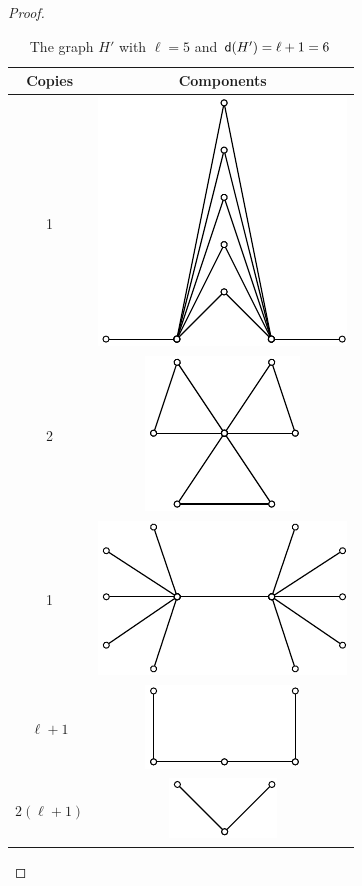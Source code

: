 \begin{proof}
\begin{table} [ht]
\begin{minipage}{.4\linewidth}
\begin{tabular}
\hline
\end{tabular}
\end{minipage} %
\qquad
\begin{minipage}{.4\linewidth}
\centering
\caption{The graph $ H' $ with $ \ell = 5 $ and $ {\mathsf{d}}(H') = \ell + 1 = 6 $}
\begin{tabular}
{c|c} \hline Copies & Components \\
\hline 1 & \includegraphics[width=0.40\columnwidth]{graphs/Hpplanartriangle1.pdf} \\
\hline 2 & \includegraphics[width=0.25\columnwidth]{graphs/Hpplanartriangle2.pdf} \\
\hline 1 & \includegraphics[width=0.45\columnwidth]{graphs/Hpplanartriangle3.pdf} \\
\hline $ \ell+1 $ & \includegraphics[width=0.3\columnwidth]{graphs/Hpplanartriangle4.pdf} \\
\hline $ 2(\ell+1) $ & \includegraphics[width=0.2\columnwidth]{graphs/Hpplanartriangle5.pdf} \\
\hline
\end{tabular}
\end{minipage}
\end{table}


\end{proof}
